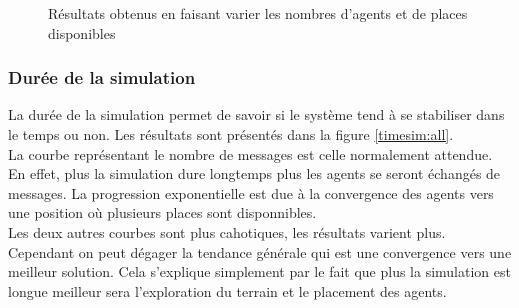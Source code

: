 \begin{figure}
\begin{center}
  \end{center}

  \caption{Résultats obtenus en faisant varier les nombres d'agents et de places disponibles}
  \label{nbagents:all}
\end{figure}

\subsubsection{Durée de la simulation}

La durée de la simulation permet de savoir si le système tend à se stabiliser dans le temps ou non.
Les résultats sont présentés dans la figure \ref{timesim:all}.\\

La courbe représentant le nombre de messages est celle normalement attendue. En effet, plus la simulation dure longtemps plus les agents se seront échangés de messages. La progression exponentielle est due à la convergence des agents vers une position où plusieurs places sont disponnibles.\\

Les deux autres courbes sont plus cahotiques, les résultats varient plus. Cependant on peut dégager la tendance générale qui est une convergence vers une meilleur solution. Cela s'explique simplement par le fait que plus la simulation est longue meilleur sera l'exploration du terrain et le placement des agents.

